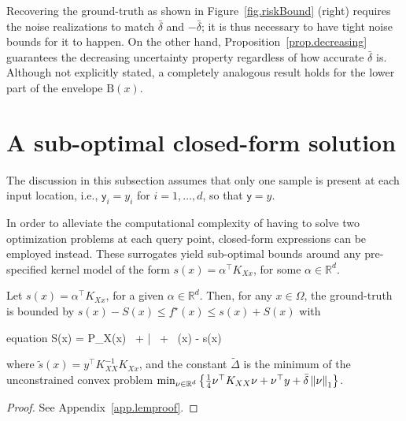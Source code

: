 \begin{remark}
	Recovering the ground-truth as shown in Figure~\ref{fig.riskBound} (right) requires the noise realizations to match $\bar \delta$ and $-\bar \delta$; it is thus necessary to have tight noise bounds for it to happen. On the other hand, Proposition~\ref{prop.decreasing} guarantees the decreasing uncertainty property regardless of how accurate $\bar \delta$ is. Although not explicitly stated, a completely analogous result holds for the lower part of the envelope $\text{B}(x)$.
\end{remark}

\section{A sub-optimal closed-form solution}

The discussion in this subsection assumes that only one sample is present at each input location, i.e., $\mathsf{y}_i = y_i$ for $i=1,\dots,d $, so that $\mathsf{y}=y$.

In order to alleviate the computational complexity of having to solve two optimization problems at each query point, closed-form expressions can be employed instead. These surrogates yield sub-optimal bounds around any pre-specified kernel model of the form $s(x) = \alpha^\top K_{Xx}$, for some $\alpha \in \mathbb{R}^d$. 
\begin{proposition}
	\label{prop:uniform}
	Let $s(x)=\alpha^\top K_{Xx}$, for a given $\alpha \in \mathbb{R}^d$. Then, for any $x\in \Omega$, the ground-truth is bounded by $s(x) - S(x) \leq f^\star(x) \leq s(x) + S(x)$ with
	\begin{empheq}[box={\mymathbox[colback=black!2,drop small lifted shadow, sharp corners]}]{equation}
		S(x) =  P_X(x) \,  + \bar{\delta} \,  + \, \vert {}(x) - s(x) \vert
		\label{eq.uniformBound2}
	\end{empheq}
	where $\tilde{s}(x) = y^\top K_{XX}^{-1} K_{Xx}$, and the constant $\tilde\Delta$ is the minimum of the unconstrained convex problem $\min_{\nu \in \mathbb{R}^d} \left\{ \frac{1}{4}\nu^\top K_{XX}\nu + \nu^\top y + \bar{\delta} \left\| \nu \right\|_1\right\}$.
\end{proposition}
\begin{proof}
	See Appendix~\ref{app.lemproof}.
\end{proof}

